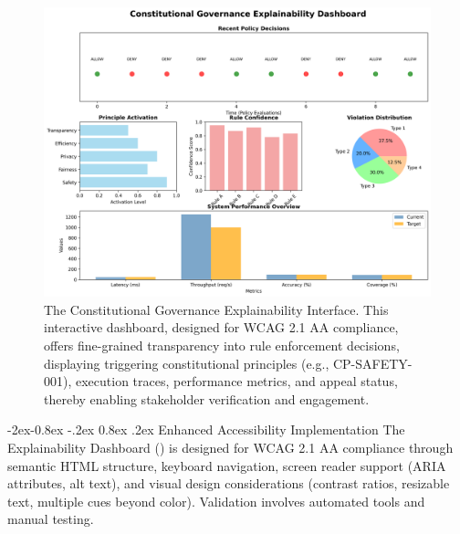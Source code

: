 \documentclass[manuscript,screen,9pt]{acmart}
\makeatletter
\renewcommand\subsubsection{\@startsection{subsubsection}{3}{\z@}%
  {-2ex\@plus -0.8ex \@minus -.2ex}%
  {0.8ex \@plus .2ex}%
  {\normalfont\normalsize\bfseries}}
\makeatother
\begin{document}
\begin{figure}[!htb]
\centering
\includegraphics[width=\linewidth,keepaspectratio]{figs/Figure_2_Enhanced_Explainability_Dashboard_Mockup.png}
\caption[Constitutional Governance Explainability Interface]{The Constitutional Governance Explainability Interface. This interactive dashboard, designed for WCAG 2.1 AA compliance, offers fine-grained transparency into rule enforcement decisions, displaying triggering constitutional principles (e.g., CP-SAFETY-001), execution traces, performance metrics, and appeal status, thereby enabling stakeholder verification and engagement.}
\label{fig:explainability_dashboard}
\end{figure}

\subsubsection{Enhanced Accessibility Implementation}
\label{subsubsec:enhanced_accessibility}
The Explainability Dashboard () is designed for WCAG 2.1 AA compliance through semantic HTML structure, keyboard navigation, screen reader support (ARIA attributes, alt text), and visual design considerations (contrast ratios, resizable text, multiple cues beyond color). Validation involves automated tools and manual testing.
\end{document}
